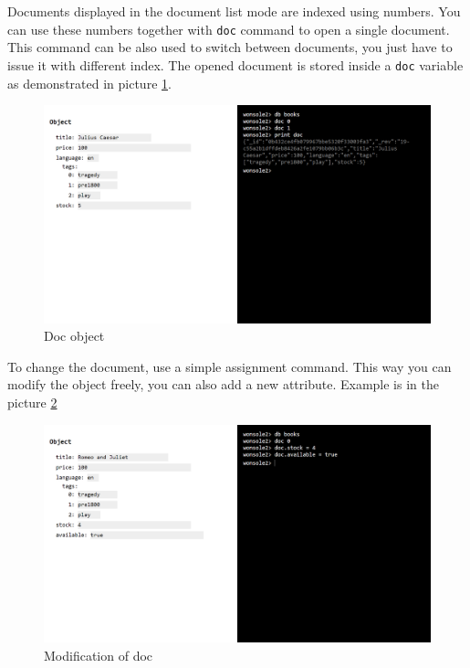 Documents displayed in the document list mode are indexed using numbers. You can
use these numbers together with \verb|doc| command to open a single document.
This command can be also used to switch between documents, you just have to
issue it with different index. The opened document is stored inside a \verb|doc|
variable as demonstrated in picture \ref{wonsole2-32}.

\begin{figure}
\centering
\includegraphics[width=\textwidth]{../../manual/screenshot/wonsole2/wonsole2-32.png}
\caption{Doc object}
\label{wonsole2-32}
\end{figure}

To change the document, use a simple assignment command. This way you can modify
the object freely, you can also add a new attribute. Example is in the picture
\ref{wonsole2-38}


\begin{figure}
\centering
\includegraphics[width=\textwidth]{../../manual/screenshot/wonsole2/wonsole2-38.png}
\caption{Modification of doc}
\label{wonsole2-38}
\end{figure}




